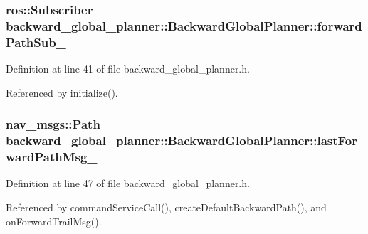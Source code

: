 \subsubsection[{\texorpdfstring{forward\+Path\+Sub\+\_\+}{forwardPathSub_}}]{\setlength{\rightskip}{0pt plus 5cm}ros\+::\+Subscriber backward\+\_\+global\+\_\+planner\+::\+Backward\+Global\+Planner\+::forward\+Path\+Sub\+\_\+\hspace{0.3cm}{\ttfamily [private]}}\hypertarget{classbackward__global__planner_1_1BackwardGlobalPlanner_ac4f74dedbfaa1034fa4cffa6d27640e7}{}\label{classbackward__global__planner_1_1BackwardGlobalPlanner_ac4f74dedbfaa1034fa4cffa6d27640e7}


Definition at line 41 of file backward\+\_\+global\+\_\+planner.\+h.



Referenced by initialize().

\subsubsection[{\texorpdfstring{last\+Forward\+Path\+Msg\+\_\+}{lastForwardPathMsg_}}]{\setlength{\rightskip}{0pt plus 5cm}nav\+\_\+msgs\+::\+Path backward\+\_\+global\+\_\+planner\+::\+Backward\+Global\+Planner\+::last\+Forward\+Path\+Msg\+\_\+\hspace{0.3cm}{\ttfamily [private]}}\hypertarget{classbackward__global__planner_1_1BackwardGlobalPlanner_a2fe940d13931d4e6e27e3c3d5e5a7db8}{}\label{classbackward__global__planner_1_1BackwardGlobalPlanner_a2fe940d13931d4e6e27e3c3d5e5a7db8}


Definition at line 47 of file backward\+\_\+global\+\_\+planner.\+h.



Referenced by command\+Service\+Call(), create\+Default\+Backward\+Path(), and on\+Forward\+Trail\+Msg().

